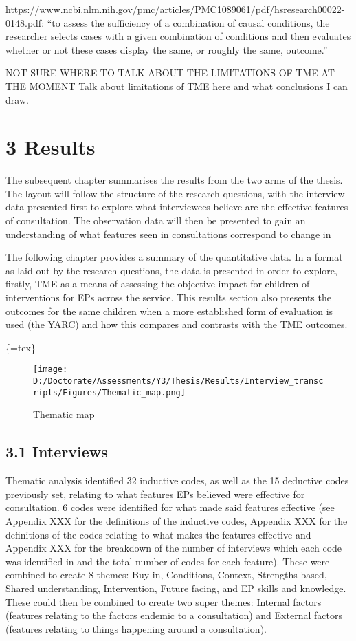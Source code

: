 \documentclass[
]{article}
\begin{document}
\url{https://www.ncbi.nlm.nih.gov/pmc/articles/PMC1089061/pdf/hsresearch00022-0148.pdf}:
``to assess the sufficiency of a combination of causal conditions, the
researcher selects cases with a given combination of conditions and then
evaluates whether or not these cases display the same, or roughly the
same, outcome.''

NOT SURE WHERE TO TALK ABOUT THE LIMITATIONS OF TME AT THE MOMENT Talk
about limitations of TME here and what conclusions I can draw.

\hypertarget{results}{%
\section{3 Results}\label{results}}

The subsequent chapter summarises the results from the two arms of the
thesis. The layout will follow the structure of the research questions,
with the interview data presented first to explore what interviewees
believe are the effective features of consultation. The observation data
will then be presented to gain an understanding of what features seen in
consultations correspond to change in

The following chapter provides a summary of the quantitative data. In a
format as laid out by the research questions, the data is presented in
order to explore, firstly, TME as a means of assessing the objective
impact for children of interventions for EPs across the service. This
results section also presents the outcomes for the same children when a
more established form of evaluation is used (the YARC) and how this
compares and contrasts with the TME outcomes.

\{=tex\} \newpage \blandscape

\begin{figure}
\centering
\texttt{[image: D:/Doctorate/Assessments/Y3/Thesis/Results/Interview\_transcripts/Figures/Thematic\_map.png]}
\caption{Thematic map}
\end{figure}

\elandscape

\hypertarget{interviews-3}{%
\subsection{3.1 Interviews}\label{interviews-3}}

Thematic analysis identified 32 inductive codes, as well as the 15
deductive codes previously set, relating to what features EPs believed
were effective for consultation. 6 codes were identified for what made
said features effective (see Appendix XXX for the definitions of the
inductive codes, Appendix XXX for the definitions of the codes relating
to what makes the features effective and Appendix XXX for the breakdown
of the number of interviews which each code was identified in and the
total number of codes for each feature). These were combined to create 8
themes: Buy-in, Conditions, Context, Strengths-based, Shared
understanding, Intervention, Future facing, and EP skills and knowledge.
These could then be combined to create two super themes: Internal
factors (features relating to the factors endemic to a consultation) and
External factors (features relating to things happening around a
consultation).
\end{document}
